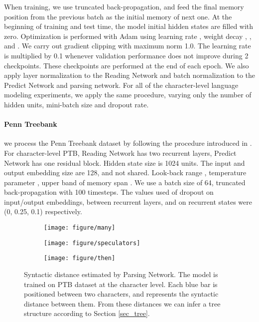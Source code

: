 \documentclass{article} \usepackage{iclr2018_conference,times}
\begin{document}
When training, we use truncated back-propagation, and feed the final memory position from the previous batch as the initial memory of next one. At the beginning of training and test time, the model initial hidden states are filled with zero. Optimization is performed with Adam using learning rate , weight decay , ,  and . We carry out gradient clipping with maximum norm 1.0.	 The learning rate is multiplied by 0.1 whenever validation performance does not improve during 2 checkpoints. These checkpoints are performed at the end of each epoch. We also apply layer normalization \citep{ba2016layer} to the Reading Network and batch normalization to the Predict Network and parsing network. For all of the character-level language modeling experiments, we apply the same procedure, varying only the number of hidden units, mini-batch size and dropout rate. 

\paragraph{Penn Treebank} we process the Penn Treebank dataset \citep{marcus1993building} by following the procedure introduced in \citep{mikolov2012subword}. For character-level PTB, Reading Network has two recurrent layers, Predict Network has one residual block. Hidden state size is 1024 units. The input and output embedding size are 128, and not shared. Look-back range , temperature parameter , upper band of memory span . We use a batch size of 64, truncated back-propagation with 100 timesteps. The values used of dropout on input/output embeddings, between recurrent layers, and on recurrent states were (0, 0.25, 0.1) respectively.

\begin{figure*}
    \centering
    \setlength{\leftskip}{-110pt}
    \begin{subfigure}[b]{1.5\textwidth}
        \texttt{[image: figure/many]}
    \end{subfigure}
    \begin{subfigure}[b]{1.5\textwidth}
        \texttt{[image: figure/speculators]}
    \end{subfigure}
    \begin{subfigure}[b]{1.5\textwidth}
        \texttt{[image: figure/then]}
    \end{subfigure}
    \caption{Syntactic distance estimated by Parsing Network. The model is trained on PTB dataset at the character level. Each blue bar is positioned between two characters, and represents the syntactic distance between them. From these distances we can infer a tree structure according to Section \ref{sec_tree}. }
    \label{fig_char}
\end{figure*}
\end{document}
